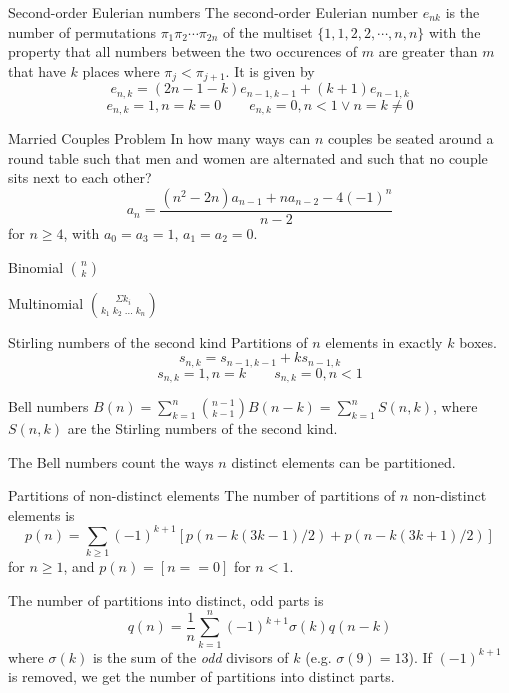 \begin{algorithm}{Second-order Eulerian numbers}
\desc
The second-order Eulerian number $e_{nk}$ is the number of
permutations $\pi_1 \pi_2 \cdots \pi_{2n}$ of the multiset
$\{1,1,2,2,\cdots,n,n\}$ with the property that all numbers between
the two occurences of $m$ are greater than $m$ that have $k$ places
where $\pi_j < \pi_{j+1}$. It is given by
$$e_{n,k} = (2n-1-k)e_{n-1,k-1} + (k+1) e_{n-1, k}$$
$$e_{n,k} = 1, n = k = 0 \qquad e_{n,k} = 0, n < 1 \vee n = k \ne 0$$
\end{algorithm}


\begin{algorithm}{Married Couples Problem}
\desc
In how many ways can $n$ couples be seated around a round table such
that men and women are alternated and such that no couple sits next to
each other?
$$a_n = \frac{(n^2-2n)a_{n-1} + na_{n-2} - 4(-1)^n}{n-2}$$
for $n \ge 4$, with $a_0 = a_3 = 1$, $a_1 = a_2 = 0$.
\end{algorithm}




\begin{algorithm}{Binomial $\binom{n}{k}$}
\end{algorithm}

\begin{algorithm}{Multinomial $\binom{\Sigma k_i}{k_1\;k_2\;\ldots\;k_n}$}
\end{algorithm}


\begin{algorithm}{Stirling numbers of the second kind}
\desc
Partitions of $n$ elements in exactly $k$ boxes.
$$s_{n,k} = s_{n-1,k-1} + ks_{n-1,k}$$
$$s_{n,k} = 1, n = k \qquad s_{n,k} = 0, n < 1$$
\end{algorithm}

\begin{algorithm}{Bell numbers}
\desc
$B(n) = \sum_{k=1}^n \binom{n-1}{k-1} B(n-k) = \sum_{k=1}^n S(n,k)$,
where $S(n, k)$ are the Stirling numbers of the second kind.

The Bell numbers count the ways $n$ distinct elements can be partitioned.
\end{algorithm}


\begin{algorithm}{Partitions of non-distinct elements}
\desc
The number of partitions of $n$ non-distinct elements is
$$p(n) = \sum_{k \ge 1} (-1)^{k+1} \left[p(n- k(3k-1)/2) + p(n-k(3k+1)/2)\right]$$
for $n \ge 1$, and $p(n) = [n == 0]$ for $n < 1$.

The number of partitions into distinct, odd parts is
$$q(n) = \frac{1}{n} \sum_{k = 1}^{n} (-1)^{k+1} \sigma(k) q(n-k)$$
where $\sigma(k)$ is the sum of the {\em odd} divisors of $k$
(e.g. $\sigma(9) = 13$).  If $(-1)^{k+1}$ is removed, we get the
number of partitions into distinct parts.

\end{algorithm}


